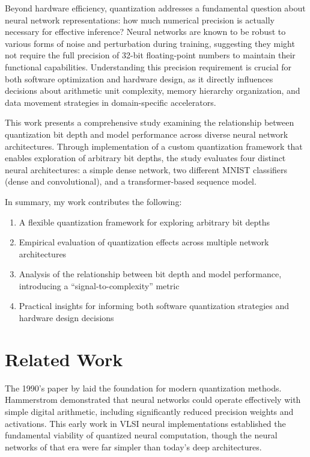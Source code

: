 \documentclass[twocolumn]{article}
\begin{document}
Beyond hardware efficiency, quantization addresses a fundamental question about
neural network representations: how much numerical precision is actually
necessary for effective inference? Neural networks are known to be robust to
various forms of noise and perturbation during training, suggesting they might
not require the full precision of 32-bit floating-point numbers to maintain
their functional capabilities. Understanding this precision requirement is
crucial for both software optimization and hardware design, as it directly
influences decisions about arithmetic unit complexity, memory hierarchy
organization, and data movement strategies in domain-specific accelerators.

This work presents a comprehensive study examining the relationship between
quantization bit depth and model performance across diverse neural network
architectures. Through implementation of a custom quantization framework that
enables exploration of arbitrary bit depths, the study evaluates four distinct
neural architectures: a simple dense network, two different MNIST classifiers
(dense and convolutional), and a transformer-based sequence model.

In summary, my work contributes the following:
\begin{enumerate}
\item A flexible quantization framework for exploring arbitrary bit depths
\item Empirical evaluation of quantization effects across multiple network architectures
\item Analysis of the relationship between bit depth and model performance, introducing a ``signal-to-complexity'' metric
\item Practical insights for informing both software quantization strategies and hardware design decisions
\end{enumerate}

\section{Related Work}
The 1990's paper by \citeauthor{hammerstrom1990digital}
\cite{hammerstrom1990digital} laid the foundation for modern quantization
methods. Hammerstrom demonstrated that neural networks could operate effectively
with simple digital arithmetic, including significantly reduced precision
weights and activations. This early work in VLSI neural implementations
established the fundamental viability of quantized neural computation, though
the neural networks of that era were far simpler than today's deep
architectures.
\end{document}
